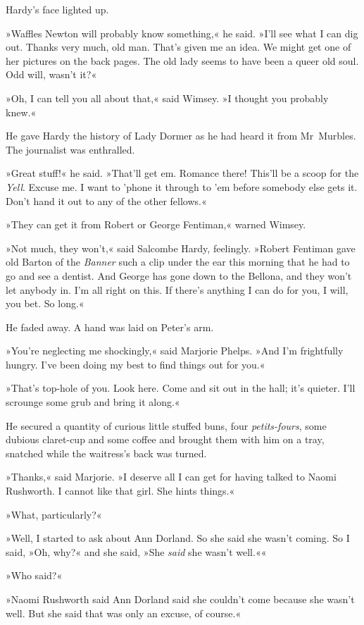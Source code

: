 Hardy's face lighted up.

»Waffles Newton will probably know something,« he said. »I'll see what I can dig out. Thanks very much, old man. That's given me an idea. We might get one of her pictures on the back pages. The old lady seems to have been a queer old soul. Odd will, wasn't it?«

»Oh, I can tell you all about that,« said Wimsey. »I thought you probably knew.«

He gave Hardy the history of Lady Dormer as he had heard it from Mr~Murbles. The journalist was enthralled.

»Great stuff!« he said. »That'll get em. Romance there! This'll be a scoop for the \textit{Yell}. Excuse me. I want to 'phone it through to 'em before somebody else gets it. Don't hand it out to any of the other fellows.«

»They can get it from Robert or George Fentiman,« warned Wimsey.

»Not much, they won't,« said Salcombe Hardy, feelingly. »Robert Fentiman gave old Barton of the \textit{Banner} such a clip under the ear this morning that he had to go and see a dentist. And George has gone down to the Bellona, and they won't let anybody in. I'm all right on this. If there's anything I can do for you, I will, you bet. So long.«

He faded away. A hand was laid on Peter's arm.

»You're neglecting me shockingly,« said Marjorie Phelps. »And I'm frightfully hungry. I've been doing my best to find things out for you.«

»That's top-hole of you. Look here. Come and sit out in the hall; it's quieter. I'll scrounge some grub and bring it along.«

He secured a quantity of curious little stuffed buns, four \textit{petits-fours}, some dubious claret-cup and some coffee and brought them with him on a tray, snatched while the waitress's back was turned.

»Thanks,« said Marjorie. »I deserve all I can get for having talked to Naomi Rushworth. I cannot like that girl. She hints things.«

»What, particularly?«

»Well, I started to ask about Ann Dorland. So she said she wasn't coming. So I said, »Oh, why?« and she said, »She \textit{said} she wasn't well.««

»Who said?«

»Naomi Rushworth said Ann Dorland said she couldn't come because she wasn't well. But she said that was only an excuse, of course.«


